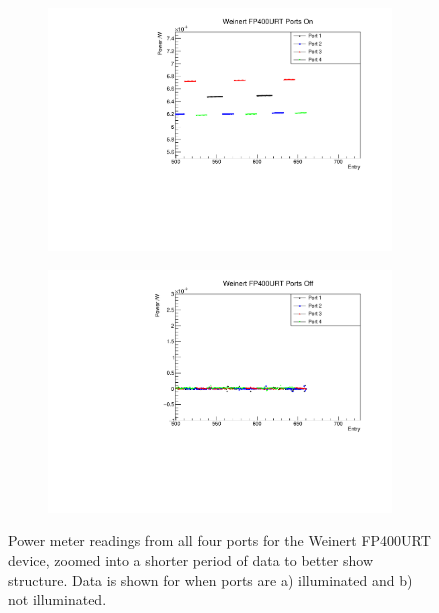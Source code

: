\documentclass[a4paper,11pt]{article}
\begin{document}
\begin{figure}[h!]
\centering
\begin{subfigure}{0.5\textwidth}
\includegraphics[width=\linewidth]{WeinertFP400URTPortsOnZoom.pdf}
\subcaption{}\label{fig:weinfp400crosstalkon}
\end{subfigure}%
\begin{subfigure}{0.5\textwidth}
\includegraphics[width=\linewidth]{WeinertFP400URTPortsOffZoom.pdf}
\subcaption{}\label{fig:weinfp400crosstalkoff}
\end{subfigure}
\caption{Power meter readings from all four ports for the Weinert FP400URT device, zoomed into a shorter period of data to better show structure. Data is shown for when ports are a) illuminated and b) not illuminated.}\label{fig:weinfp400crosstalk}
\end{figure}
\end{document}
